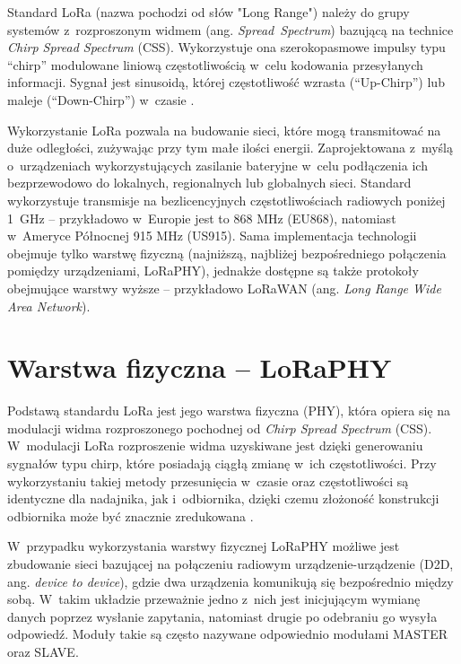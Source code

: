 Standard LoRa (nazwa pochodzi od słów "Long Range") należy do grupy systemów z~rozproszonym widmem (ang.
\textsl{Spread~Spectrum}) bazującą na technice \textsl{Chirp Spread Spectrum} (CSS). Wykorzystuje ona szerokopasmowe
impulsy typu \enquote{chirp} modulowane liniową częstotliwością w~celu kodowania przesyłanych informacji. Sygnał
jest sinusoidą, której częstotliwość wzrasta (\enquote{Up-Chirp}) lub maleje (\enquote{Down-Chirp}) w~czasie
\cite{semtech-lora-lorawan,ieee-802-15-4-2006}.

Wykorzystanie LoRa pozwala na budowanie sieci, które mogą transmitować na duże odległości, zużywając przy tym małe
ilości energii. Zaprojektowana z~myślą o~urządzeniach wykorzystujących zasilanie bateryjne w~celu podłączenia ich
bezprzewodowo do lokalnych, regionalnych lub globalnych sieci. Standard wykorzystuje transmisje na bezlicencyjnych
częstotliwościach radiowych poniżej 1~GHz -- przykładowo w~Europie jest to 868 MHz (EU868), natomiast w~Ameryce
Północnej 915 MHz (US915). Sama implementacja technologii obejmuje tylko warstwę fizyczną (najniższą, najbliżej
bezpośredniego połączenia pomiędzy urządzeniami, LoRaPHY), jednakże dostępne są także protokoły obejmujące warstwy
wyższe -- przykładowo LoRaWAN (ang. \textsl{Long Range Wide Area Network}).

\section{\label{sect:loraphy}Warstwa fizyczna -- LoRaPHY} Podstawą standardu LoRa jest jego warstwa fizyczna (PHY),
która opiera się na modulacji widma rozproszonego pochodnej od \textsl{Chirp Spread Spectrum} (CSS). W~modulacji LoRa
rozproszenie widma uzyskiwane jest dzięki generowaniu sygnałów typu chirp, które posiadają ciągłą zmianę w~ich
częstotliwości. Przy wykorzystaniu takiej metody przesunięcia w~czasie oraz częstotliwości są identyczne dla nadajnika,
jak i~odbiornika, dzięki czemu złożoność konstrukcji odbiornika może być znacznie zredukowana
\cite{lora-modulation-basics}.

W~przypadku wykorzystania warstwy fizycznej LoRaPHY możliwe jest zbudowanie sieci bazującej na połączeniu radiowym
urządzenie-urządzenie (D2D, ang. \textsl{device to device}), gdzie dwa urządzenia komunikują się bezpośrednio między
sobą. W~takim układzie przeważnie jedno z~nich jest inicjującym wymianę danych poprzez wysłanie zapytania, natomiast
drugie po odebraniu go wysyła odpowiedź. Moduły takie są często nazywane odpowiednio modułami MASTER oraz SLAVE.

